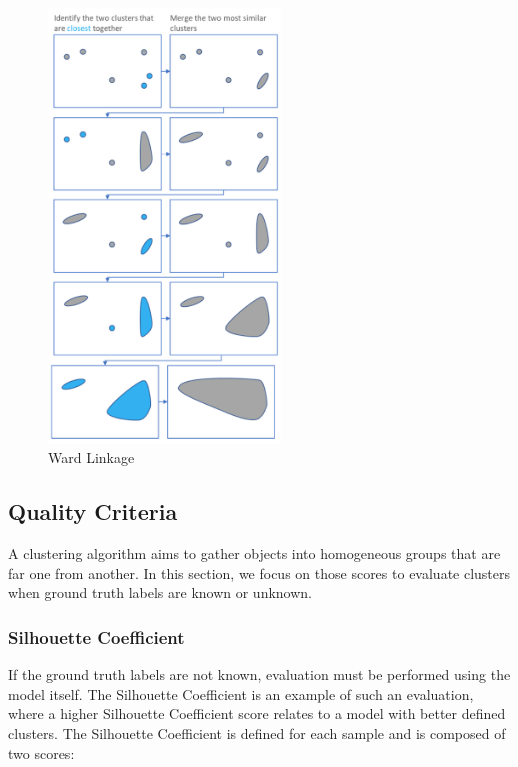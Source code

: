 \documentclass[a4paper, 12pt]{article}
\begin{document}
\begin{figure}[ht]
    \centering
    \includegraphics[width=0.55\textwidth]{Ward Linkage.png}
    \caption{Ward Linkage \citep{hierarchicaltutorial2017}}
\end{figure}

\subsection{Quality Criteria}

A clustering algorithm aims to gather objects into homogeneous groups that are far one from another. In this section, we focus on those scores to evaluate clusters when ground truth labels are known or unknown.

\subsubsection{Silhouette Coefficient}

If the ground truth labels are not known, evaluation must be performed using the model itself. The Silhouette Coefficient \citep{rousseeuw1987silhouettes} is an example of such an evaluation, where a higher Silhouette Coefficient score relates to a model with better defined clusters. The Silhouette Coefficient is defined for each sample and is composed of two scores:
\end{document}
